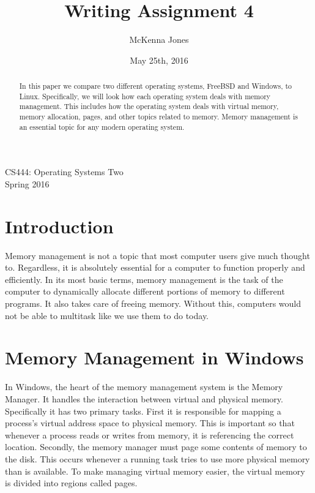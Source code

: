 \documentclass[letterpaper,10pt,titlepage,draftclsnofoot,onecolumn]{IEEEtran}
\title{Writing Assignment 4}
\author{McKenna Jones}
\date{May 25th, 2016}
\begin{document}
\begin{titlepage}
\maketitle
\begin{center}
CS444: Operating Systems Two \\
Spring 2016
\vspace{50 mm}
\end{center}
\begin{abstract}
In this paper we compare two different operating systems, FreeBSD and Windows, to Linux. Specifically, we will look how each operating system deals with memory management. This includes how the operating system deals with virtual memory, memory allocation, pages, and other topics related to memory. Memory management is an essential topic for any modern operating system. 

\end{abstract}
\end{titlepage}
\section{Introduction}
Memory management is not a topic that most computer users give much thought to. Regardless, it is absolutely essential for a computer to function properly and efficiently. In its most basic terms, memory management is the task of the computer to dynamically allocate different portions of memory to different programs. It also takes care of freeing memory. Without this, computers would not be able to multitask like we use them to do today. 
 
\section{Memory Management in Windows}
In Windows, the heart of the memory management system is the Memory Manager. It handles the interaction between virtual and physical memory. Specifically it has two primary tasks. First it is responsible for mapping a process's virtual address space to physical memory. This is important so that whenever a process reads or writes from memory, it is referencing the correct location. Secondly, the memory manager must page some contents of memory to the disk. This occurs whenever a running task tries to use more physical memory than is available. \cite{windows} To make managing virtual memory easier, the virtual memory is divided into regions called pages.
\end{document}
